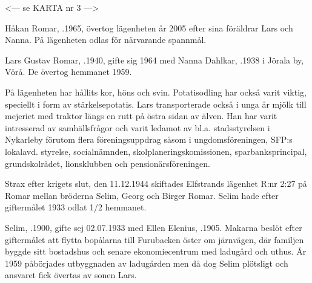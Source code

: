

<--- se KARTA nr 3 --->



%



%

Håkan Romar, .1965, övertog lägenheten år 2005 efter sina föräldrar Lars och Nanna. På lägenheten odlas för närvarande spannmål.


%
Lars Gustav Romar, .1940, gifte sig 1964 med Nanna Dahlkar, .1938 i Jörala by, Vörå. De övertog hemmanet 1959.
\begin{jhchildren}
  \item {}
  \item {}
\end{jhchildren}

På lägenheten har hållits kor, höns och svin. Potatisodling har också varit viktig, speciellt i form av stärkelsepotatis. Lars transporterade också i unga år mjölk till mejeriet med traktor längs en rutt på östra sidan av älven. Han har varit intresserad av samhällsfrågor och varit ledamot av bl.a. stadsstyrelsen i Nykarleby förutom flera föreningsuppdrag såsom i ungdomsföreningen, SFP:s lokalavd. styrelse, socialnämnden, skolplaneringskomissionen, sparbanksprincipal, grundskolrådet, lionsklubben och pensionärsföreningen.


%

Strax efter krigets slut, den 11.12.1944 skiftades Elfstrands lägenhet R:nr 2:27 på Romar mellan bröderna Selim, Georg och Birger Romar. Selim hade efter giftermålet 1933 odlat 1/2 hemmanet.

Selim, .1900, gifte sej 02.07.1933 med Ellen Elenius, .1905. Makarna beslöt efter giftermålet att flytta bopålarna till Furubacken öster om järnvägen, där familjen byggde sitt bostadshus och senare ekonomiecentrum med ladugård och uthus. År 1959 påbörjades utbyggnaden av ladugården men då dog Selim plötsligt och ansvaret fick övertas av sonen Lars.

